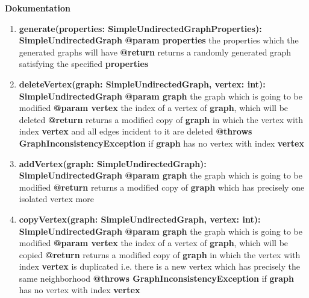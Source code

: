 \documentclass{article}
\begin{document}
	\textbf{Dokumentation}
	\begin{enumerate}[+]
		\item{
			\textbf{generate(properties: SimpleUndirectedGraphProperties): SimpleUndirectedGraph} \newline
			\textbf{@param properties} the properties which the generated graphs will have \newline
			\textbf{@return} returns a randomly generated graph satisfying the specified \textbf{properties}
		}
		\item{
			\textbf{deleteVertex(graph: SimpleUndirectedGraph, vertex: int): SimpleUndirectedGraph} \newline
			\textbf{@param graph} the graph which is going to be modified \newline
			\textbf{@param vertex} the index of a vertex of \textbf{graph}, which will be deleted \newline
			\textbf{@return} returns a modified copy of \textbf{graph} in which the vertex with index \textbf{vertex} and all edges incident to it are deleted \newline
			\textbf{@throws GraphInconsistencyException} if \textbf{graph} has no vertex with index \textbf{vertex} 
		}
		\item{
			\textbf{addVertex(graph: SimpleUndirectedGraph): SimpleUndirectedGraph} \newline
			\textbf{@param graph} the graph which is going to be modified \newline
			\textbf{@return} returns a modified copy of \textbf{graph} which has precisely one isolated vertex more
		}
		\item{
			\textbf{copyVertex(graph: SimpleUndirectedGraph, vertex: int): SimpleUndirectedGraph} \newline
			\textbf{@param graph} the graph which is going to be modified \newline
			\textbf{@param vertex} the index of a vertex of \textbf{graph}, which will be copied \newline
			\textbf{@return} returns a modified copy of \textbf{graph} in which the vertex with index \textbf{vertex} is duplicated i.e. there is a new vertex which has precisely the same neighborhood \newline
			\textbf{@throws GraphInconsistencyException} if \textbf{graph} has no vertex with index \textbf{vertex} 
		}
		
		~\newpage
		

\end{enumerate}
\end{document}
